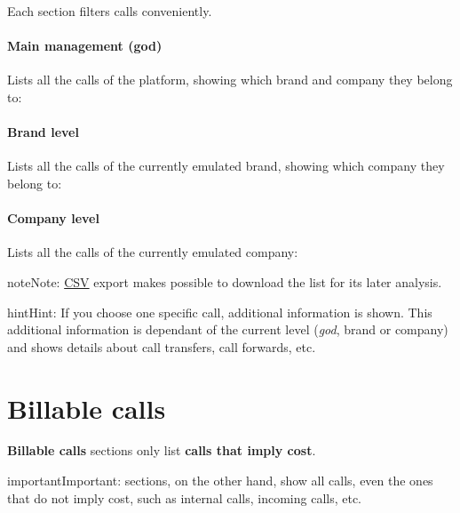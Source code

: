 \documentclass[letterpaper,10pt,english]{sphinxmanual}
\begin{document}
Each section filters calls conveniently.
\paragraph{Main management (god)}

Lists all the calls of the platform, showing which brand and company they belong to:

\noindent{}
\paragraph{Brand level}

Lists all the calls of the currently emulated brand, showing which company they
belong to:

\noindent{}
\paragraph{Company level}

Lists all the calls of the currently emulated company:

\noindent{}

\begin{notice}{note}{Note:}
\href{https://es.wikipedia.org/wiki/CSV}{CSV} export makes possible to
download the list for its later analysis.
\end{notice}

\begin{notice}{hint}{Hint:}
If you choose one specific call, additional information is shown. This
additional information is dependant of the current level (\emph{god}, brand or
company) and shows details about call transfers, call forwards, etc.
\end{notice}


\section{Billable calls}
\label{billing_and_invoices/billable_calls::doc}\label{billing_and_invoices/billable_calls:billable-calls}\label{billing_and_invoices/billable_calls:id1}
\textbf{Billable calls} sections only list \textbf{calls that imply cost}.

\begin{notice}{important}{Important:}
{\hyperref[billing_and_invoices/call_registry:call\string-registry]{}} sections, on the other hand, show all calls,
even the ones that do not imply cost, such as internal calls, incoming calls,
etc.
\end{notice}
\end{document}
